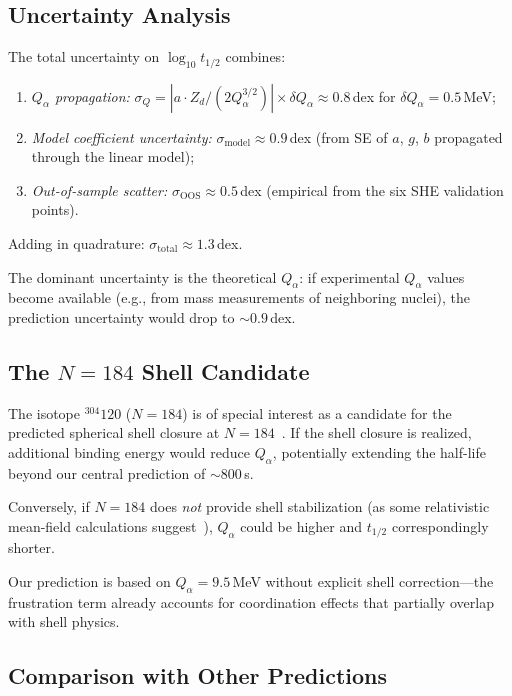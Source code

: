 \documentclass[12pt,a4paper,twocolumn]{revtex4-2}
\newcommand{\thalf}{t_{1/2}}
\newcommand{\Qalpha}{Q_\alpha}
\newcommand{\Zd}{Z_d}
\begin{document}
\subsection{Uncertainty Analysis}

The total uncertainty on $\log_{10}\thalf$ combines:
\begin{enumerate}
\item \emph{$\Qalpha$ propagation:}
  $\sigma_Q = |a \cdot \Zd / (2 \Qalpha^{3/2})| \times
  \delta\Qalpha \approx 0.8$\,dex for $\delta\Qalpha = 0.5$\,MeV;
\item \emph{Model coefficient uncertainty:}
  $\sigma_{\mathrm{model}} \approx 0.9$\,dex (from SE of $a$, $g$,
  $b$ propagated through the linear model);
\item \emph{Out-of-sample scatter:}
  $\sigma_{\mathrm{OOS}} \approx 0.5$\,dex (empirical from the
  six SHE validation points).
\end{enumerate}

Adding in quadrature:
$\sigma_{\mathrm{total}} \approx 1.3$\,dex.

The dominant uncertainty is the theoretical $\Qalpha$: if
experimental $\Qalpha$ values become available (e.g., from
mass measurements of neighboring nuclei), the prediction
uncertainty would drop to $\sim 0.9$\,dex.

\subsection{The $N = 184$ Shell Candidate}

The isotope ${}^{304}120$ ($N = 184$) is of special interest
as a candidate for the predicted spherical shell closure at
$N = 184$~\cite{Sobiczewski2007,Bender2003}.  If the shell
closure is realized, additional binding energy would reduce
$\Qalpha$, potentially extending the half-life beyond our
central prediction of $\sim 800$\,s.

Conversely, if $N = 184$ does \emph{not} provide shell
stabilization (as some relativistic mean-field calculations
suggest~\cite{Afanasjev2013}), $\Qalpha$ could be higher
and $\thalf$ correspondingly shorter.

Our prediction is based on $\Qalpha = 9.5$\,MeV without
explicit shell correction---the frustration term already
accounts for coordination effects that partially overlap
with shell physics.

\subsection{Comparison with Other Predictions}
\end{document}
